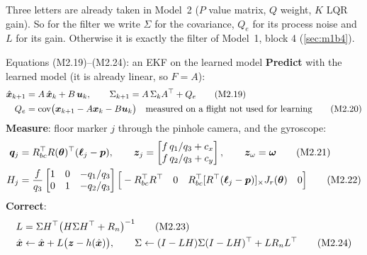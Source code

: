 Three letters are already taken in Model~2 ($P$ value matrix, $Q$ weight, $K$ LQR gain). So for the filter we write
$\Sigma$ for the covariance, $Q_e$ for its process noise and $L$ for its gain. Otherwise it is exactly the filter of
Model~1, block 4 (\cref{sec:m1b4}).

\begin{eqbox}{Equations (M2.19)--(M2.24): an EKF on the learned model}
\textbf{Predict} with the learned model (it is already linear, so $F=A$):
\begin{align}
  \hat{\bm x}_{k+1}&=A\,\hat{\bm x}_k+B\,\bm{u}_k,\qquad \Sigma_{k+1}=A\,\Sigma_kA^\top+Q_e \tag{M2.19}\\
  Q_e&=\mathrm{cov}\big(\bm{x}_{k+1}-A\bm{x}_k-B\bm{u}_k\big)\quad\text{measured on a flight not used for learning} \tag{M2.20}
\end{align}
\textbf{Measure}: floor marker $j$ through the pinhole camera, and the gyroscope:
\begin{align}
  \bm q_j&=R_{bc}^\top R(\bm{\theta})^\top(\bm\ell_j-\bm{p}),\qquad
  \bm{z}_j=\begin{bmatrix}f\,q_1/q_3+c_x\\ f\,q_2/q_3+c_y\end{bmatrix},\qquad \bm{z}_\omega=\bm{\omega} \tag{M2.21}\\
  H_j&=\frac{f}{q_3}\begin{bmatrix}1&0&-q_1/q_3\\0&1&-q_2/q_3\end{bmatrix}
  \Big[-R_{bc}^\top R^\top\quad 0\quad R_{bc}^\top[R^\top(\bm\ell_j-\bm{p})]_{\times}J_r(\bm{\theta})\quad 0\Big] \tag{M2.22}
\end{align}
\textbf{Correct}:
\begin{align}
  L&=\Sigma H^\top\big(H\Sigma H^\top+R_n\big)^{-1} \tag{M2.23}\\
  \hat{\bm x}&\leftarrow\hat{\bm x}+L\big(\bm{z}-h(\hat{\bm x})\big),\qquad \Sigma\leftarrow(I-LH)\Sigma(I-LH)^\top+LR_nL^\top \tag{M2.24}
\end{align}
\end{eqbox}

